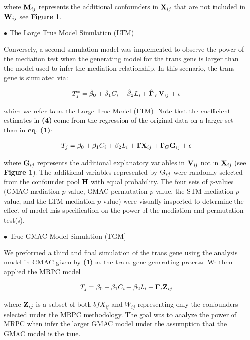 \documentclass[
]{article}
\begin{document}
where \({\bf M}_{ij}\) represents the additional confounders in
\({\bf X}_{ij}\) that are not included in \({\bf W}_{ij}\) see
\textbf{Figure 1}.

\indent \(\bullet\) The Large True Model Simulation (LTM)

Conversely, a second simulation model was implemented to observe the
power of the mediation test when the generating model for the trans gene
is larger than the model used to infer the mediation relationship. In
this scenario, the trans gene is simulated via:

\begin{eqnarray} T^{\ast}_{j} = \hat{\beta}_0+\hat{\beta}_1C_i + \hat{\beta}_2L_i + \hat{{\bf \Gamma}}_V{\bf V}_{ij} +\epsilon  \end{eqnarray}

which we refer to as the Large True Model (LTM). Note that the
coefficient estimates in \textbf{(4)} come from the regression of the
original data on a larger set than in \textbf{eq. (1)}:

\begin{eqnarray} T_{j} = \beta_0+\beta_1C_i + \beta_2L_i + {\bf\Gamma} {\bf X}_{ij} + {\bf \Gamma}_{G}{\bf G}_{ij} +\epsilon \end{eqnarray}

where \({\bf G}_{ij}\) represents the additional explanatory variables
in \({\bf V}_{ij}\) not in \({\bf X}_{ij}\) (see \textbf{Figure 1}). The
additional variables represented by \({\bf G}_{ij}\) were randomly
selected from the confounder pool \({\bf H}\) with equal probability.
The four sets of \(p\)-values (GMAC mediation \(p\)-value, GMAC
permutation \(p\)-value, the STM mediation \(p\)-value, and the LTM
mediation \(p\)-value) were visually inspected to determine the effect
of model mis-specification on the power of the mediation and permutation
test(s).

\indent \(\bullet\) True GMAC Model Simulation (TGM)

We preformed a third and final simulation of the trans gene using the
analysis model in GMAC given by \textbf{(1)} as the trans gene
generating process. We then applied the MRPC model

\begin{eqnarray}  T_j = \beta_0 + \beta_1 C_i +\beta_2 L_i + {\bf \Gamma}_z {\bf Z}_{ij} \end{eqnarray}

where \({\bf Z}_{ij}\) is a subset of both \({bf X}_{ij}\) and
\({W}_{ij}\) representing only the confounders selected under the MRPC
methodology. The goal was to analyze the power of MRPC when infer the
larger GMAC model under the assumption that the GMAC model is the true.
\end{document}
